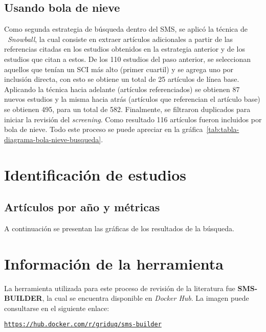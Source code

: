 \subsection{Usando bola de nieve}
\noindent
Como segunda estrategia de búsqueda dentro del SMS, se aplicó la técnica de ~\textit{Snowball}, la cual consiste en extraer artículos adicionales a partir de las referencias citadas en los estudios obtenidos en la estrategia anterior y de los estudios que citan a estos. De los 110 estudios del paso anterior, se seleccionan aquellos que tenían un SCI más alto (primer cuartil) y se agrega uno por inclusión directa, con esto se obtiene un total de 25 artículos de línea base. Aplicando la técnica hacia adelante (artículos referenciados) se obtienen 87 nuevos estudios y la misma hacia atrás (artículos que referencian el artículo base) se obtienen 495, para un total de 582. Finalmente, se filtraron duplicados para iniciar la revisión del \textit{screening}. Como resultado 116 artículos fueron incluidos por bola de nieve. Todo este proceso se puede apreciar en la gráfica~\ref{tab:tabla-diagrama-bola-nieve-busqueda}.


\section{Identificación de estudios}

\subsection{Artículos por año y métricas}
\noindent
A continuación se presentan las gráficas de los resultados de la búsqueda. 


\section{Información de la herramienta}

\noindent
La herramienta utilizada para este proceso de revisión de la literatura fue \textbf{SMS-BUILDER}, la cual se encuentra disponible en \textit{Docker Hub}. La imagen puede consultarse en el siguiente enlace:

\begin{center}
\href{https://hub.docker.com/r/griduq/sms-builder}{\texttt{https://hub.docker.com/r/griduq/sms-builder}}
\end{center}

